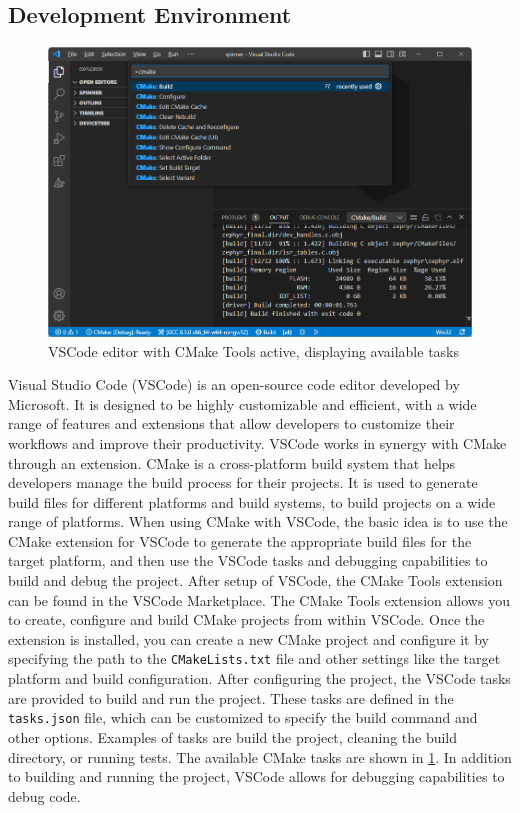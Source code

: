 \subsection{Development Environment}
\begin{figure}[htbp]
	\centering
	\includegraphics[width=.8\textwidth]{Figures/3_cmake_vscode.png}
	\caption[VSCode editor with CMake Tools active]{VSCode editor with CMake Tools active, displaying available tasks}
	\label{fig:3_vscode_cmake_build}
\end{figure}

Visual Studio Code (VSCode) is an \gls{open-source} code editor developed by Microsoft. It is designed to be highly customizable and efficient, with a wide range of features and extensions that allow developers to customize their workflows and improve their productivity. VSCode works in synergy with CMake through an extension. CMake is a cross-platform build system that helps developers manage the build process for their projects. It is used to generate build files for different platforms and build systems, to build projects on a wide range of platforms. When using CMake with VSCode, the basic idea is to use the CMake extension for VSCode to generate the appropriate build files for the target platform, and then use the VSCode tasks and debugging capabilities to build and debug the project. After setup of VSCode, the CMake Tools \cite{cmake} extension can be found in the VSCode Marketplace. The CMake Tools extension allows you to create, configure and build CMake projects from within VSCode. Once the extension is installed, you can create a new CMake project and configure it by specifying the path to the \texttt{CMakeLists.txt} file and other settings like the target platform and build configuration. After configuring the project, the VSCode tasks are provided to build and run the project. These tasks are defined in the \texttt{tasks.json} file, which can be customized to specify the build command and other options. Examples of tasks are build the project, cleaning the build directory, or running tests. The available CMake tasks are shown in \cref{fig:3_vscode_cmake_build}. In addition to building and running the project, VSCode allows for debugging capabilities to debug code.

